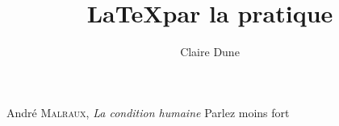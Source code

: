 \documentclass[10pt,a4paper]{article}
\author{Claire Dune}
\title{\LaTeX par la pratique}
\begin{document}
 André \textsc{Malraux}, \emph{La condition humaine}
            {\tiny Parlez moins fort}
\end{document}
